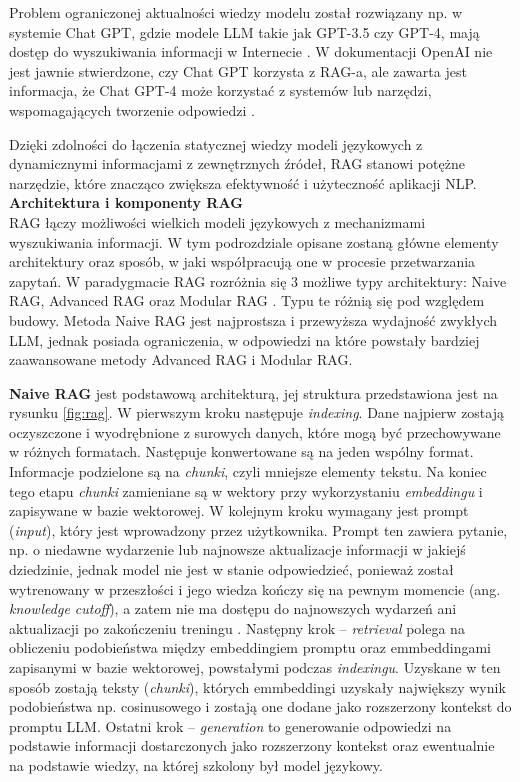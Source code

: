 \documentclass[
a4paper,
12pt,
]{article}
\newcounter{subsubsubsection}[subsubsection]
\begin{document}
Problem ograniczonej aktualności wiedzy modelu został rozwiązany np. w systemie Chat GPT, gdzie modele LLM takie jak GPT-3.5 czy GPT-4, mają dostęp do wyszukiwania informacji w Internecie \cite{openai:chatgpt:truth}. W dokumentacji OpenAI nie jest jawnie stwierdzone, czy Chat GPT korzysta z RAG-a, ale zawarta jest informacja, że Chat GPT-4 może korzystać z systemów lub narzędzi, wspomagających tworzenie odpowiedzi \cite{openai:chatgpt:dev}.

Dzięki zdolności do łączenia statycznej wiedzy modeli językowych z dynamicznymi informacjami z zewnętrznych źródeł, RAG stanowi potężne narzędzie, które znacząco zwiększa efektywność i użyteczność aplikacji NLP.\\

\noindent\textbf{Architektura i komponenty RAG}\\

RAG łączy możliwości wielkich modeli językowych z mechanizmami wyszukiwania informacji. W tym podrozdziale opisane zostaną główne elementy architektury oraz sposób, w jaki współpracują one w procesie przetwarzania zapytań. W paradygmacie RAG rozróżnia się 3 możliwe typy architektury: Naive RAG, Advanced RAG oraz Modular RAG \cite{rag:survey}. Typu te różnią się pod względem budowy. Metoda Naive RAG jest najprostsza i przewyższa wydajność zwykłych LLM, jednak posiada ograniczenia, w odpowiedzi na które powstały bardziej zaawansowane metody Advanced RAG i Modular RAG.

\textbf{Naive RAG} jest podstawową architekturą, jej struktura przedstawiona jest na rysunku \ref{fig:rag}. 
% 
W pierwszym kroku następuje \textit{indexing}. Dane najpierw zostają oczyszczone i wyodrębnione z surowych danych, które mogą być przechowywane w różnych formatach. Następuje konwertowane są na jeden wspólny format. Informacje podzielone są na \textit{chunki}, czyli mniejsze elementy tekstu. Na koniec tego etapu \textit{chunki} zamieniane są w wektory przy wykorzystaniu \textit{embeddingu} i zapisywane w bazie wektorowej. 
% 
W kolejnym kroku wymagany jest prompt (\textit{input}), który jest wprowadzony przez użytkownika. Prompt ten zawiera pytanie, np. o niedawne wydarzenie lub najnowsze aktualizacje informacji w jakiejś dziedzinie, jednak model nie jest w stanie odpowiedzieć, ponieważ został wytrenowany w przeszłości i jego wiedza kończy się na pewnym momencie (ang. \textit{knowledge cutoff}), a zatem nie ma dostępu do najnowszych wydarzeń ani aktualizacji po zakończeniu treningu \cite{rag:cutoff}.
% 
Następny krok -- \textit{retrieval} polega na obliczeniu podobieństwa między embeddingiem
promptu oraz emmbeddingami zapisanymi w bazie wektorowej, powstałymi podczas \textit{indexingu}. Uzyskane w ten sposób zostają teksty (\textit{chunki}), których emmbeddingi uzyskały największy wynik podobieństwa np. cosinusowego i zostają one dodane jako rozszerzony kontekst do promptu LLM. 
% 
Ostatni krok -- \textit{generation} to generowanie odpowiedzi na podstawie informacji dostarczonych jako rozszerzony kontekst oraz ewentualnie na podstawie wiedzy, na której szkolony był model językowy. 
\end{document}
